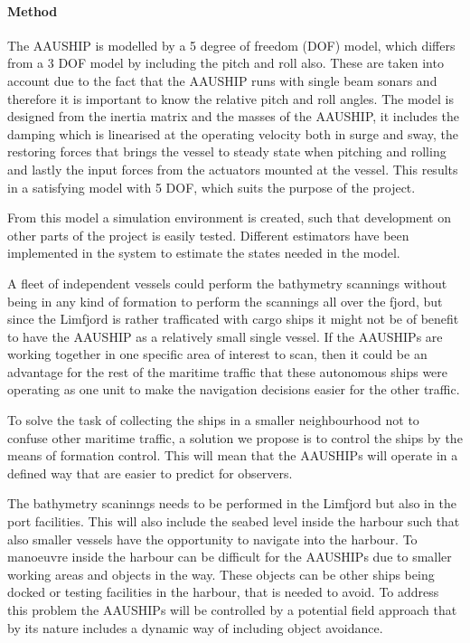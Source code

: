 \documentclass[a4paper,12pt]{article}
\begin{document}
\paragraph{Method}
The AAUSHIP is modelled by a 5 degree of freedom (DOF) model, which
differs from a 3 DOF model by including the pitch and roll also.
These are taken into account due to the fact that the AAUSHIP runs
with single beam sonars and therefore it is important to know the
relative pitch and roll angles. The model is designed from the inertia
matrix and the masses of the AAUSHIP, it includes the damping which is
linearised at the operating velocity both in surge and sway, the
restoring forces that brings the vessel to steady state when pitching
and rolling and lastly the input forces from the actuators mounted at
the vessel. This results in a satisfying model with 5 DOF, which suits
the purpose of the project.

From this model a simulation environment is created, such that
development on other parts of the project is easily tested.  Different
estimators have been implemented in the system to estimate the states
needed in the model.


A fleet of independent vessels could perform the bathymetry scannings
without being in any kind of formation to perform the scannings all
over the fjord, but since the Limfjord is rather trafficated with cargo
ships it might not be of benefit to have the AAUSHIP as a relatively
small single vessel. If the AAUSHIPs are working together in one
specific area of interest to scan, then it could be an advantage for
the rest of the maritime traffic that these autonomous ships were
operating as one unit to make the navigation decisions easier for the
other traffic.

To solve the task of collecting the ships in a smaller neighbourhood
not to confuse other maritime traffic, a solution we propose is to
control the ships by the means of formation control. This will mean
that the AAUSHIPs will operate in a defined way that are easier to predict
for observers.

The bathymetry scaninngs needs to be performed in the Limfjord but
also in the port facilities. This will also include the seabed
level inside the harbour such that also smaller vessels have the
opportunity to navigate into the harbour. To manoeuvre inside the
harbour can be difficult for the AAUSHIPs due to smaller working areas
and objects in the way. These objects can be other ships being docked
or testing facilities in the harbour, that is needed to avoid. To
address this problem the AAUSHIPs will be controlled by a potential
field approach that by its nature includes a dynamic way of including
object avoidance.
\end{document}
